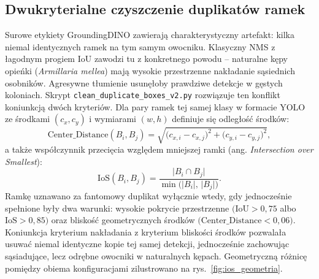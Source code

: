 \subsection{Dwukryterialne czyszczenie duplikatów ramek}
Surowe etykiety GroundingDINO zawierają charakterystyczny artefakt: kilka niemal identycznych ramek na tym samym owocniku. Klasyczny NMS z łagodnym progiem IoU zawodzi tu z konkretnego powodu – naturalne kępy opieńki (\textit{Armillaria mellea}) mają wysokie przestrzenne nakładanie sąsiednich osobników. Agresywne tłumienie usunęłoby prawdziwe detekcje w gęstych koloniach. Skrypt \texttt{clean\_duplicate\_boxes\_v2.py} rozwiązuje ten konflikt koniunkcją dwóch kryteriów. Dla pary ramek tej samej klasy w formacie YOLO ze środkami $(c_x, c_y)$ i wymiarami $(w, h)$ definiuje się odległość środków:
\begin{equation}
\mathrm{Center\_Distance}(B_i, B_j)
=
\sqrt{\bigl(c_{x,i}-c_{x,j}\bigr)^{2}+\bigl(c_{y,i}-c_{y,j}\bigr)^{2}},
\end{equation}
a także współczynnik przecięcia względem mniejszej ramki (ang. \textit{Intersection over Smallest}):
\begin{equation}
\mathrm{IoS}(B_i, B_j)
=
\frac{\lvert B_i \cap B_j \rvert}{\min\bigl(\lvert B_i \rvert,\,\lvert B_j \rvert\bigr)}.
\end{equation}
Ramkę uznawano za fantomowy duplikat wyłącznie wtedy, gdy jednocześnie spełnione były dwa warunki: wysokie pokrycie przestrzenne $\bigl(\mathrm{IoU} > 0{,}75$ albo $\mathrm{IoS} > 0{,}85\bigr)$ oraz bliskość geometrycznych środków $\bigl(\mathrm{Center\_Distance} < 0{,}06\bigr)$. Koniunkcja kryterium nakładania z kryterium bliskości środków pozwalała usuwać niemal identyczne kopie tej samej detekcji, jednocześnie zachowując sąsiadujące, lecz odrębne owocniki w naturalnych kępach. Geometryczną różnicę pomiędzy obiema konfiguracjami zilustrowano na rys.~\ref{fig:ios_geometria}.

